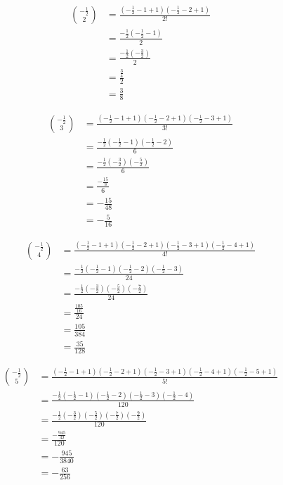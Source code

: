 \documentclass{article}
\begin{document}
    \begin{align*}
    \binom{-\frac{1}{2}}{2} & =\frac{\left(-\frac{1}{2}-1+1\right)\left(-\frac{1}{2}-2+1\right)}{2!} \\
    & =\frac{-\frac{1}{2}\left(-\frac{1}{2}-1\right)}{2} \\
    & =\frac{-\frac{1}{2}\left(-\frac{3}{2}\right)}{2} \\
    & =\frac{\frac{3}{4}}{2} \\
    & =\frac{3}{8}
    \end{align*}

    \begin{align*}
    \binom{-\frac{1}{2}}{3} & =\frac{\left(-\frac{1}{2}-1+1\right)\left(-\frac{1}{2}-2+1\right)\left(-\frac{1}{2}-3+1\right)}{3!} \\
    & =\frac{-\frac{1}{2}\left(-\frac{1}{2}-1\right)\left(-\frac{1}{2}-2\right)}{6} \\
    & =\frac{-\frac{1}{2}\left(-\frac{3}{2}\right)\left(-\frac{5}{2}\right)}{6} \\
    & =\frac{-\frac{15}{8}}{6} \\
    & =-\frac{15}{48} \\
    & =-\frac{5}{16}
    \end{align*}

    \begin{align*}
    \binom{-\frac{1}{2}}{4} & =\frac{\left(-\frac{1}{2}-1+1\right)\left(-\frac{1}{2}-2+1\right)\left(-\frac{1}{2}-3+1\right)\left(-\frac{1}{2}-4+1\right)}{4!} \\
    & =\frac{-\frac{1}{2}\left(-\frac{1}{2}-1\right)\left(-\frac{1}{2}-2\right)\left(-\frac{1}{2}-3\right)}{24} \\
    & =\frac{-\frac{1}{2}\left(-\frac{3}{2}\right)\left(-\frac{5}{2}\right)\left(-\frac{7}{2}\right)}{24} \\
    & =\frac{\frac{105}{16}}{24} \\
    & =\frac{105}{384} \\
    & =\frac{35}{128}
    \end{align*}

    \begin{align*}
    \binom{-\frac{1}{2}}{5} & =\frac{\left(-\frac{1}{2}-1+1\right)\left(-\frac{1}{2}-2+1\right)\left(-\frac{1}{2}-3+1\right)\left(-\frac{1}{2}-4+1\right)\left(-\frac{1}{2}-5+1\right)}{5!} \\
    & =\frac{-\frac{1}{2}\left(-\frac{1}{2}-1\right)\left(-\frac{1}{2}-2\right)\left(-\frac{1}{2}-3\right)\left(-\frac{1}{2}-4\right)}{120} \\
    & =\frac{-\frac{1}{2}\left(-\frac{3}{2}\right)\left(-\frac{5}{2}\right)\left(-\frac{7}{2}\right)\left(-\frac{9}{2}\right)}{120} \\
    & =\frac{-\frac{945}{32}}{120} \\
    & =-\frac{945}{3840} \\
    & =-\frac{63}{256}
    \end{align*}
\end{document}

